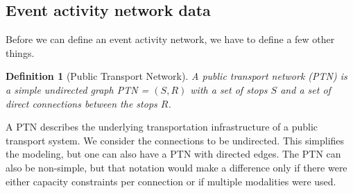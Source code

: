 \documentclass[english, 12pt, a4paper, sci, utf8, a-2b, online]{aaltothesis}
\newtheorem{definition}{Definition}
\newcommand{\draft}[1]{\textcolor{red}{\em (DRAFT) #1}}
\begin{document}


%     
\subsection{Event activity network data}
\label{sec:ean-def}







Before we can define an event activity network, we have to define a few other things.
\begin{definition}[Public Transport Network]\label{def:ptn}
    A \textit{public transport network} (PTN) is a simple undirected graph PTN = $(S, R)$ with a set of stops $S$ and a set of direct connections between the stops $R$. 
\end{definition}

A PTN describes the underlying transportation infrastructure of a public transport system. We consider the connections to be undirected. This simplifies the modeling, but one can also have a PTN with directed edges. The PTN can also be non-simple, but that notation would make a difference only if there were either capacity constraints per connection or if multiple modalities were used.
\end{document}
